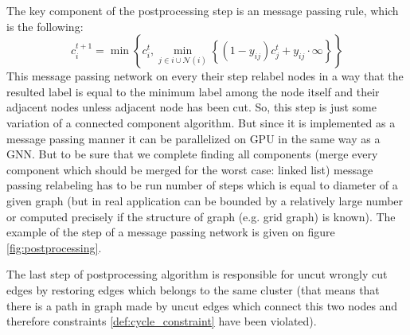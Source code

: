 \documentclass[10pt, twocolumn, a4paper]{article}
\theoremstyle{definition}
\begin{document}
\begin{figure*}[h]
    \caption{Illustration of the step of the message passing postprocessing network: colors and labels in nodes corresponds to the
        cluster of nodes: same color and label -- same cluster. Black edges is a uncut edges of the original graph $G$ and
        \textcolor{gray!80}{gray} -- cut edges of $G$. After a message passing step 3 nodes which have been connected by uncut edges
        changed their labels to the minimal label among the neighborhood. At the same time the node with label 4 didn't changed their label
        because it is not connected by uncut edge to any node with smaller label on this step. Also we denote with \textcolor{blue}{blue} color edge that became
        incident to nodes from the same cluster and therefore
        on the last step of the postprocessing algorithm will be restored.} \label{fig:postprocessing}
\end{figure*}

The key component of the postprocessing step is an message passing rule, which is the following:
\begin{equation} \label{def:postprocessing_mpn}
    c_i^{t+1} = \min \left\{ c_i^{t}, \min\limits_{j \in i \cup \mathcal{N}(i)} \left\{ (1 - y_{ij})c_j^{t} + y_{ij} \cdot \infty \right\}  \right\}
\end{equation}
This message passing network on every their step relabel nodes in a way that the resulted label is
equal to the minimum label among the node itself and their adjacent nodes unless adjacent node has been cut.
So, this step is just some variation of a connected component algorithm. But since it is implemented as a message passing
manner it can be parallelized on GPU in the same way as a GNN. But to be sure that we complete finding
all components (merge every component which should be merged for the worst case: linked list) message passing
relabeling has to be run number of steps which is equal to diameter of a given graph (but in real application can
be bounded by a relatively large number or computed precisely if the structure of graph (e.g. grid graph)
is known). The example of the step of a message passing network is given on figure \ref{fig:postprocessing}.

The last step of postprocessing algorithm is responsible for uncut wrongly cut edges by restoring edges
which belongs to the same cluster (that means that there is a path in graph made by uncut edges which
connect this two nodes and therefore constraints \eqref{def:cycle_constraint} have been violated).
\end{document}
